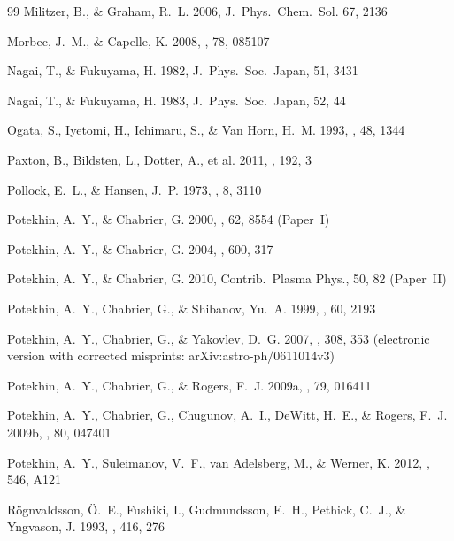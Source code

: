 \documentclass[traditabstract]{aa}
\begin{document}
\begin{thebibliography}{99}
Militzer, B., \& Graham, R.~L.
2006,
J.~Phys.\ Chem.\ Sol. 67, 2136

Morbec, J.~M., \& Capelle, K.
2008,
\prb, 78, 085107

Nagai, T., \& Fukuyama, H.
1982,
J.\ Phys.\ Soc.\ Japan, 51, 3431

Nagai, T., \& Fukuyama, H.
1983,
J.\ Phys.\ Soc.\ Japan, 52, 44

Ogata, S., Iyetomi, H., Ichimaru, S., \& Van Horn, H.~M.
1993,
\pre, 48, 1344

Paxton, B., Bildsten, L., Dotter, A., et al.
2011,
\apjs, 192, 3

Pollock, E.~L., \& Hansen, J.~P.
1973,
\pra, 8, 3110

Potekhin, A.~Y., \& Chabrier, G.
2000,
\pre, {62}, 8554
(Paper~I)

Potekhin, A.~Y., \& Chabrier, G.
2004,
\apj, 600, 317

Potekhin, A.~Y., \& Chabrier, G.
2010,
Contrib.\ Plasma Phys., 50, 82 (Paper~II)

Potekhin, A.~Y., Chabrier, G., \& Shibanov, Yu.~A.
1999,
\pre, 60, 2193
 
Potekhin, A.~Y., Chabrier, G., \& Yakovlev, D.~G.
2007,
\apss, 308, 353
(electronic version with corrected
misprints: arXiv:astro-ph/0611014v3)
 
Potekhin, A.~Y., Chabrier, G., \& Rogers, F.~J.
2009a,
\pre, {79}, 016411

Potekhin, A.~Y., Chabrier, G., Chugunov, A.~I., DeWitt, H.~E.,
\& Rogers, F.~J.
2009b,
\pre, {80}, 047401

Potekhin, A.~Y., Suleimanov, V.~F., van Adelsberg, M., \&
Werner, K.
2012,
\aap, 546, A121

R\"ognvaldsson, \"O.~E., Fushiki, I., Gudmundsson, E.~H.,
Pethick, C.~J., \& Yngvason, J.
1993,
\apj, 416, 276


\end{thebibliography}
\end{document}
